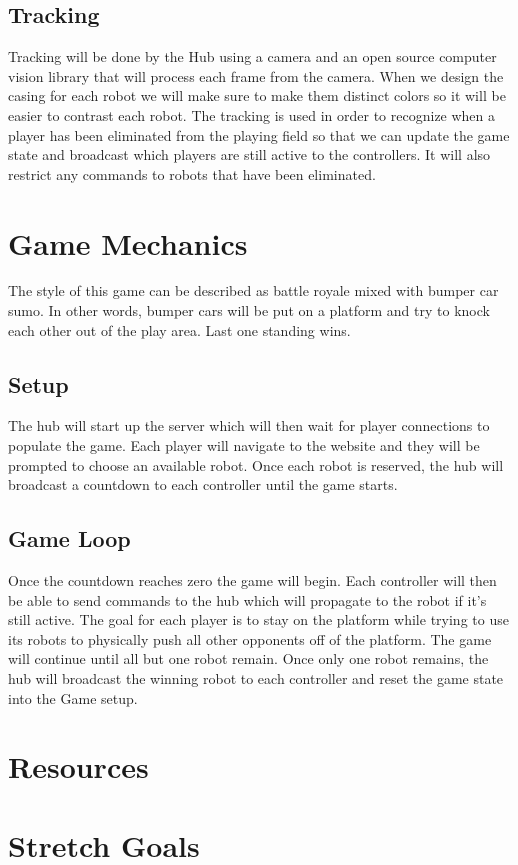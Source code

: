 \documentclass[11pt]{ieeeconf}
\begin{document}
\subsection{Tracking}

Tracking will be done by the Hub using a camera and an open source computer vision library that will process each frame from the camera. When we design the casing for each robot we will make sure to make them distinct colors so it will be easier to contrast each robot. The tracking is used in order to recognize when a player has been eliminated from the playing field so that we can update the game state and broadcast which players are still active to the controllers. It will also restrict any commands to robots that have been eliminated.

\section{Game Mechanics}

The style of this game can be described as battle royale mixed with bumper car sumo. In other words, bumper cars will be put on a platform and try to knock each other out of the play area. Last one standing wins. 

\subsection{Setup}

The hub will start up the server which will then wait for player connections to populate the game. Each player will navigate to the website and they will be prompted to choose an available robot. Once each robot is reserved, the hub will broadcast a countdown to each controller until the game starts. 

\subsection{Game Loop}

Once the countdown reaches zero the game will begin. Each controller will then be able to send commands to the hub which will propagate to the robot if it's still active. The goal for each player is to stay on the platform while trying to use its robots to physically push all other opponents off of the platform. The game will continue until all but one robot remain. Once only one robot remains, the hub will broadcast the winning robot to each controller and reset the game state into the Game setup. 

\section{Resources}

\section{Stretch Goals}



% 
% 
\end{document}

